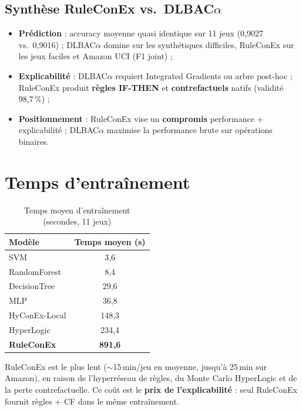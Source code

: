 \documentclass[11pt,a4paper]{article}
\begin{document}
\subsection{Synthèse RuleConEx vs.\ DLBAC$\alpha$}

\begin{itemize}
  \item \textbf{Prédiction} : accuracy moyenne quasi identique sur 11 jeux (0,9027 vs.\ 0,9016) ; DLBAC$\alpha$ domine sur les synthétiques difficiles, RuleConEx sur les jeux faciles et Amazon UCI (F1 joint) ;
  \item \textbf{Explicabilité} : DLBAC$\alpha$ requiert Integrated Gradients ou arbre post-hoc ; RuleConEx produit \textbf{règles IF-THEN} et \textbf{contrefactuels} natifs (validité 98,7\,\%) ;
  \item \textbf{Positionnement} : RuleConEx vise un \textbf{compromis} performance + explicabilité ; DLBAC$\alpha$ maximise la performance brute sur opérations binaires.
\end{itemize}

\section{Temps d'entraînement}

\begin{table}[h]
\centering
\caption{Temps moyen d'entraînement (secondes, 11 jeux)}
\small
\begin{tabular}{@{}lc@{}}
\toprule
\textbf{Modèle} & \textbf{Temps moyen (s)} \\
\midrule
SVM & 3,6 \\
RandomForest & 8,4 \\
DecisionTree & 29,6 \\
MLP & 36,8 \\
HyConEx-Local & 148,3 \\
HyperLogic & 234,4 \\
\textbf{RuleConEx} & \textbf{891,6} \\
\bottomrule
\end{tabular}
\end{table}

RuleConEx est le plus lent ($\sim$15\,min/jeu en moyenne, jusqu'à 25\,min sur Amazon), en raison de l'hyperréseau de règles, du Monte Carlo HyperLogic et de la perte contrefactuelle. Ce coût est le \textbf{prix de l'explicabilité} : seul RuleConEx fournit règles + CF dans le même entraînement.
\end{document}
